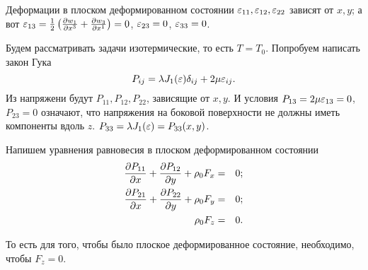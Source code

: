 Деформации в плоском деформированном состоянии $\varepsilon_{11},\varepsilon_{12},\varepsilon_{22}$ зависят от $x,y$; а вот $\varepsilon_{13} = \frac12\left( \frac{\partial w_1}{\partial x^3} + \frac{\partial w_3}{\partial x^1} \right)=0$, $\varepsilon_{23}=0$, $\varepsilon_{33} = 0$.

Будем рассматривать задачи изотермические, то есть $T=T_0$. Попробуем написать закон Гука
\[
  P_{ij} = \lambda J_1(\varepsilon)\delta_{ij} + 2\mu\varepsilon_{ij}.
\]
Из напряжени будут $P_{11},P_{12},P_{22}$, зависящие от $x,y$. И условия $P_{13} = 2\mu\varepsilon_{13} = 0$, $P_{23}=0$ означают, что напряжения на боковой поверхности не должны иметь компоненты вдоль $z$. $P_{33} = \lambda J_1(\varepsilon)= P_{33}(x,y)$.

Напишем уравнения равновесия в плоском деформированном состоянии
\begin{eqnarray*}
  \frac{\partial P_{11}}{\partial x} + \frac{\partial P_{12}}{\partial y} + \rho_0 F_x &=& 0;\\
  \frac{\partial P_{21}}{\partial x} + \frac{\partial P_{22}}{\partial y} + \rho_0 F_y &=& 0;\\
  \rho_0 F_z &=& 0.
\end{eqnarray*}

То есть для того, чтобы было плоское деформированное состояние, необходимо, чтобы $F_z=0$.
